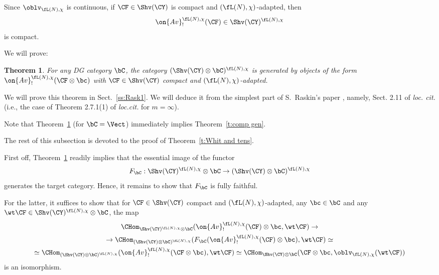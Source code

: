 \documentclass[9pt]{amsart}
\newtheorem{thm}[subsubsection]{Theorem}
\theoremstyle{definition}
\theoremstyle{remark}
\newcommand{\thmref}[1]{Theorem~\ref{#1}}
\newcommand{\secref}[1]{Sect.~\ref{#1}}
\numberwithin{equation}{section}
\begin{document}
\medskip

Since $\oblv_{\fL(N),\chi}$ is continuous, if $\CF\in \Shv(\CY)$ is compact and $(\fL(N),\chi)$-adapted, then
$$\on{Av}^{\fL(N),\chi}_!(\CF)\in \Shv(\CY)^{\fL(N),\chi}$$
is compact.

\medskip

We will prove:

\begin{thm}  \label{t:enough} 
For any DG category $\bC$, the category $(\Shv(\CY)\otimes \bC)^{\fL(N),\chi}$ is generated by objects of the form 
$\on{Av}^{\fL(N),\chi}_!(\CF\otimes \bc)$ with
$\CF\in \Shv(\CY)$ compact and $(\fL(N),\chi)$-adapted.
\end{thm}

We will prove this theorem in \secref{ss:Rask1}. We will deduce it from the simplest part of S.~Raskin's paper \cite{Ras},
namely, Sect. 2.11 of {\it loc. cit.} (i.e., the case of Theorem 2.7.1(1) of {\it loc.cit.} for $m=\infty$). 

\sssec{}   \label{sss:proof compact}

Note that \thmref{t:enough} (for $\bC=\Vect$) immediately implies \thmref{t:comp gen}.

\sssec{}

The rest of this subsection is devoted to the proof of \thmref{t:Whit and tens}. 

\medskip

First off, \thmref{t:enough} readily implies that the essential image of the functor 
$$F_\bC:\Shv(\CY)^{\fL(N),\chi}\otimes \bC\to (\Shv(\CY)\otimes \bC)^{\fL(N),\chi}$$
generates the target category. Hence, it remains to show that $F_\bC$ is fully faithful.

\medskip

For the latter, it suffices to show that for $\CF\in \Shv(\CY)$ compact and $(\fL(N),\chi)$-adapted, any $\bc\in \bC$
and any $\wt\CF\in \Shv(\CY)^{\fL(N),\chi}\otimes \bC$, the map 
\begin{multline}  \label{e:ff tensor}
\CHom_{\Shv(\CY)^{\fL(N),\chi}\otimes \bC}(\on{Av}^{\fL(N),\chi}_!(\CF)\otimes \bc,\wt\CF)\to  \\
\to \CHom_{(\Shv(\CY)\otimes \bC)^{\fL(N),\chi}}(F_\bC(\on{Av}^{\fL(N),\chi}_!(\CF)\otimes \bc),\wt\CF)\simeq \\
\simeq  \CHom_{(\Shv(\CY)\otimes \bC)^{\fL(N),\chi}}(\on{Av}^{\fL(N),\chi}_!(\CF\otimes \bc),\wt\CF)\simeq
\CHom_{\Shv(\CY)\otimes \bC}(\CF\otimes \bc,\oblv_{\fL(N),\chi}(\wt\CF))
\end{multline} 
is an isomorphism. 
\end{document}
